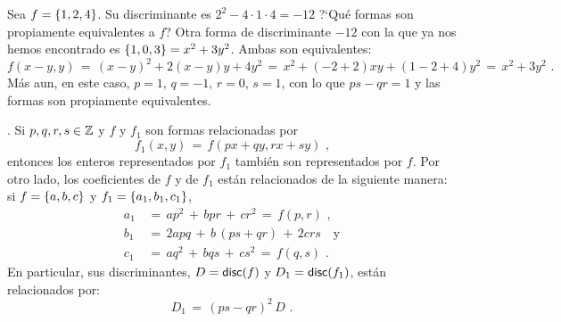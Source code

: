 \begin{ejemDefiniciones}\label{ejem:definiciones:equivalencia:traslacion}
	Sea $f=\left\{1,2,4\right\}$. Su discriminante es
	$2^2-4\cdot 1\cdot 4=-12$
	?`Qu\'e formas son propiamente equivalentes a $f$?
	Otra forma de discriminante $-12$ con la que ya nos hemos
	encontrado es $\left\{1,0,3\right\}=x^2+3y^2$.
	Ambas son equivalentes:
	\begin{displaymath}
		f(x-y,y)\,=\,(x-y)^2+2(x-y)y+4y^2\,=\,
			x^2+(-2+2)xy+(1-2+4)y^2\,=\,
			x^2+3y^2
		\text{ .}
	\end{displaymath}
	M\'as aun, en este caso, $p=1$, $q=-1$, $r=0$, $s=1$,
	con lo que $ps-qr=1$ y las formas son propiamente equivalentes.
\end{ejemDefiniciones}

\begin{obsDefiniciones}\label{obs:definiciones:equivalencia:invariantes}
	\quedacomoejercicio.
	Si $p,q,r,s\in\mathbb{Z}$ y $f$ y $f_1$ son formas relacionadas por
	\begin{equation}
		\label{eq:definiciones:equivalencia:cambio}
		f_1(x,y)\,=\,f(px+qy,rx+sy)
		\text{ ,}
	\end{equation}
	entonces los enteros representados por $f_1$ tambi\'en son
	representados por $f$.
	Por otro lado, los coeficientes de $f$ y de $f_1$ est\'an
	relacionados de la siguiente manera:
	si $f=\left\{a,b,c\right\}$ y $f_1=\left\{a_1,b_1,c_1\right\}$,
	\begin{equation}
		\label{eq:definiciones:equivalencia:coeficientes}
		\begin{aligned}
			a_1 & \,=\, ap^2\,+\,bpr\,+\,cr^2\,=\,f(p,r)
				\text{ ,} \\
			b_1 & \,=\, 2apq\,+\,b\,(ps+qr)\,+\,2crs
				\quad\text{y} \\
			c_1 & \,=\, aq^2\,+\,bqs\,+\,cs^2\,=\,f(q,s)
				\text{ .}
		\end{aligned}
	\end{equation}
	En particular, sus discriminantes, $D=\mathsf{disc}(f)$ y
	$D_1=\mathsf{disc}(f_1)$, est\'an relacionados por:
	\begin{equation}
		\label{eq:definiciones:equivalencia:discriminantes}
		D_1\,=\,(ps-qr)^2\,D
		\text{ .}
	\end{equation}
\end{obsDefiniciones}

